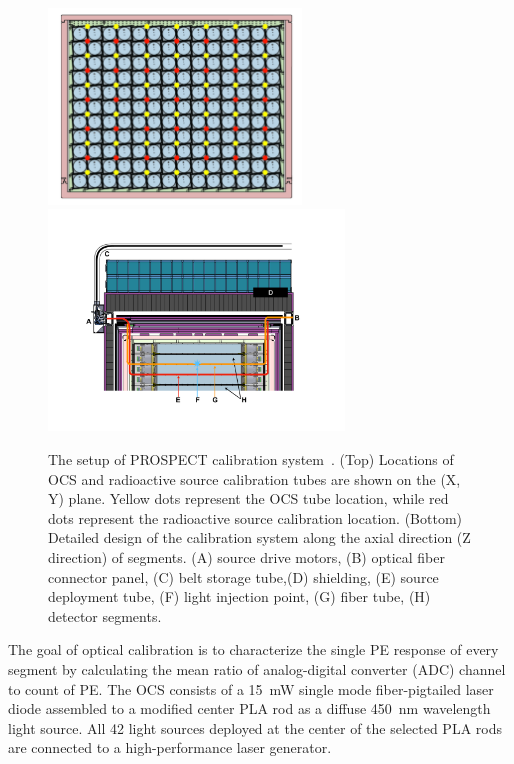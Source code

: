 \begin{figure}[h!]
\centering
\includegraphics[width=0.6\textwidth]{Figures/CalibXY.pdf} \\
\includegraphics[width=0.7\textwidth]{Figures/CalibZ.pdf}
\caption[The setup of the PROSPECT calibration system]{
The setup of PROSPECT calibration system~\cite{bib:prospect_nim}.
(Top) Locations of OCS and radioactive source calibration tubes are shown on the (X, Y) plane. Yellow dots represent the OCS tube location, while red dots represent the radioactive source calibration location.
(Bottom) Detailed design of the calibration system along the axial direction (Z direction) of segments.
(A) source drive motors, (B) optical fiber connector panel, (C) belt storage tube,(D) shielding, (E) source deployment tube, (F) light injection point, (G) fiber tube, (H) detector segments. }
\label{fig:calibsystem}
\end{figure}

The goal of optical calibration is to characterize the single PE response of every segment by calculating the mean ratio of analog-digital converter (ADC) channel to count of PE. 
The OCS consists of a 15~mW single mode fiber-pigtailed laser diode assembled to a modified center PLA rod as a diffuse 450~nm wavelength light source.  
All 42 light sources deployed at the center of the selected PLA rods are connected to a high-performance laser generator. 


